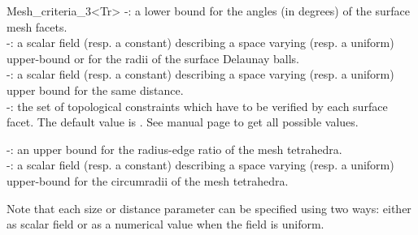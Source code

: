 \begin{ccRefClass}{Mesh_criteria_3<Tr>}
-: a lower bound for the angles (in degrees) of the
surface mesh facets.\\
-: a scalar field (resp. a constant) describing
 a space varying (resp. a uniform) upper-bound or for the radii of the surface Delaunay balls. \\
-: a scalar field (resp. a constant) describing a space varying (resp. a uniform)
  upper bound for the same distance. \\
-: the set of topological constraints
	which have to be verified by each surface facet. The default value is 
	. See  manual page to
	get all possible values.

-: an upper bound for the radius-edge ratio of the  mesh tetrahedra.\\
-: a scalar field (resp. a constant) describing
 a space varying (resp. a uniform) upper-bound for the circumradii of the  mesh tetrahedra.



Note that each size or distance parameter can be specified using two ways: either as 
scalar field or as a numerical value when the field is uniform.



\end{ccRefClass}
